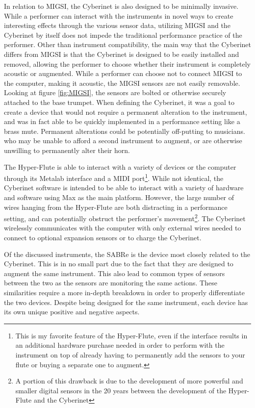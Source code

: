 In relation to MIGSI, the Cyberinet is also designed to be minimally invasive. While a performer can interact with the instruments in novel ways to create interesting effects through the various sensor data, utilizing MIGSI and the Cyberinet by itself does not impede the traditional performance practice of the performer. Other than instrument compatibility, the main way that the Cyberinet differs from MIGSI is that the Cyberinet is designed to be easily installed and removed, allowing the performer to choose whether their instrument is completely acoustic or augmented. While a performer can choose not to connect MIGSI to the computer, making it acoustic, the MIGSI sensors are not easily removable. Looking at figure \ref{fig:MIGSI}, the sensors are bolted or otherwise securely attached to the base trumpet. When defining the Cyberinet, it was a goal to create a device that would not require a permanent alteration to the instrument, and was in fact able to be quickly implemented in a performance setting like a brass mute. Permanent alterations could be potentially off-putting to musicians. who may be unable to afford a second instrument to augment, or are otherwise unwilling to permanently alter their horn.

The Hyper-Flute is able to interact with a variety of devices or the computer through its Metalab interface and a MIDI port\footnote{This is my favorite feature of the Hyper-Flute, even if the interface results in an additional hardware purchase needed in order to perform with the instrument on top of already having to permanently add the sensors to your flute or buying a separate one to augment.}. While not identical, the Cyberinet software is intended to be able to interact with a variety of hardware and software using Max as the main platform. However, the large number of wires hanging from the Hyper-Flute are both distracting in a performance setting, and can potentially obstruct the performer's movement\footnote{A portion of this drawback is due to the development of more powerful and smaller digital sensors in the 20 years between the development of the Hyper-Flute and the Cyberinet}. The Cyberinet wirelessly communicates with the computer with only external wires needed to connect to optional expansion sensors or to charge the Cyberinet.


Of the discussed instruments, the SABRe is the device most closely related to the Cyberinet. This is in no small part due to the fact that they are designed to augment the same instrument. This also lead to common types of sensors between the two as the sensors are monitoring the same actions. These similarities require a more in-depth breakdown in order to properly differentiate the two devices. Despite being designed for the same instrument, each device has its own unique positive and negative aspects.


